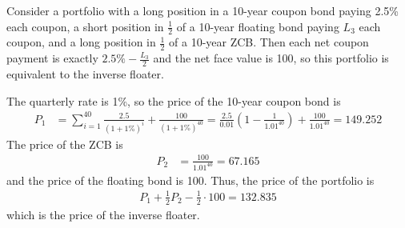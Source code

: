 \documentclass{article}
\begin{document}
\begin{enumerate}[1.]
\begin{enumerate}[(a)]
\begin{soln}
					Consider a portfolio with a long position in a 10-year coupon bond paying 2.5\% each coupon, a short position in $\frac{1}{2}$ of a 10-year floating bond paying $L_3$ each coupon, and a long position in $\frac{1}{2}$ of a 10-year ZCB. Then each net coupon payment is exactly $2.5\%-\frac{L_3}{2}$ and the net face value is 100, so this portfolio is equivalent to the inverse floater.

					The quarterly rate is 1\%, so the price of the 10-year coupon bond is 
					\begin{align*}
						P_1 &= \sum_{i=1}^{40} \frac{2.5}{(1+1\%)^i} + \frac{100}{(1+1\%)^{40}} = \frac{2.5}{0.01}\left( 1-\frac{1}{1.01^{40}} \right) + \frac{100}{1.01^{40}} = 149.252
					\end{align*}
					The price of the ZCB is
					\begin{align*}
						P_2 &= \frac{100}{1.01^{40}} = 67.165
					\end{align*}
					and the price of the floating bond is 100. Thus, the price of the portfolio is
					\begin{align*}
						P_1 + \frac{1}{2} P_2 - \frac{1}{2}\cdot 100 = \boxed{132.835}
					\end{align*}
					which is the price of the inverse floater.
				\end{soln}


\end{enumerate}
\end{enumerate}
\end{document}
